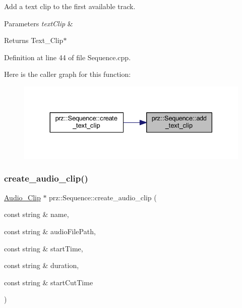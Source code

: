 Add a text clip to the first available track. 


\begin{DoxyParams}{Parameters}
{\em text\+Clip} & \\
\hline
\end{DoxyParams}
\begin{DoxyReturn}{Returns}
Text\+\_\+\+Clip$\ast$ 
\end{DoxyReturn}


Definition at line 44 of file Sequence.\+cpp.

Here is the caller graph for this function\+:
\nopagebreak
\begin{figure}[H]
\begin{center}
\leavevmode
\includegraphics[width=330pt]{classprz_1_1_sequence_a66229b6f4cab505e8569e31dfe023e08_icgraph}
\end{center}
\end{figure}
\mbox{\label{classprz_1_1_sequence_a736917b939054ae04941bdede0a16e4a}} 
\subsubsection{\texorpdfstring{create\_audio\_clip()}{create\_audio\_clip()}}
{\footnotesize\ttfamily \mbox{\hyperlink{classprz_1_1_audio___clip}{Audio\+\_\+\+Clip}} $\ast$ prz\+::\+Sequence\+::create\+\_\+audio\+\_\+clip (\begin{DoxyParamCaption}\item[{const string \&}]{name,  }\item[{const string \&}]{audio\+File\+Path,  }\item[{const string \&}]{start\+Time,  }\item[{const string \&}]{duration,  }\item[{const string \&}]{start\+Cut\+Time }\end{DoxyParamCaption})}



